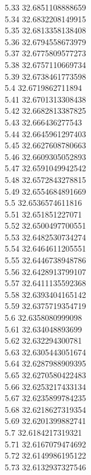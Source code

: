 {5.33	32.6851108888659\\
5.34	32.6832208149915\\
5.35	32.6813358138408\\
5.36	32.6794558673979\\
5.37	32.6775809577273\\
5.38	32.6757110669734\\
5.39	32.6738461773598\\
5.4	32.6719862711894\\
5.41	32.6701313308438\\
5.42	32.6682813387825\\
5.43	32.666436277543\\
5.44	32.6645961297403\\
5.45	32.6627608780663\\
5.46	32.6609305052893\\
5.47	32.6591049942542\\
5.48	32.6572843278815\\
5.49	32.6554684891669\\
5.5	32.6536574611816\\
5.51	32.651851227071\\
5.52	32.6500497700551\\
5.53	32.6482530734274\\
5.54	32.6464611205551\\
5.55	32.6446738948786\\
5.56	32.6428913799107\\
5.57	32.6411135592368\\
5.58	32.6393404165142\\
5.59	32.6375719354719\\
5.6	32.6358080999098\\
5.61	32.634048893699\\
5.62	32.632294300781\\
5.63	32.6305443051674\\
5.64	32.6287988909395\\
5.65	32.6270580422483\\
5.66	32.6253217433134\\
5.67	32.6235899784235\\
5.68	32.6218627319354\\
5.69	32.6201399882741\\
5.7	32.6184217319321\\
5.71	32.6167079474692\\
5.72	32.6149986195122\\
5.73	32.6132937327546\\
}
